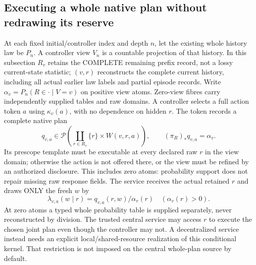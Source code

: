 \documentclass{article}
\begin{document}
\subsection{Executing a whole native plan without redrawing its reserve}
At each fixed initial/controller index and depth $n$, let the existing whole history law be $P_n$. A controller view $V_n$ is a countable projection of that history. In this subsection $R_v$ retains the COMPLETE remaining prefix record, not a lossy current-state statistic; $(v,r)$ reconstructs the complete current history, including all actual earlier law labels and partial episode records. Write $\alpha_v=P_n(R\in\cdot\mid V=v)$ on positive view atoms. Zero-view fibres carry independently supplied tables and raw domains. A controller selects a full action token $a$ using $\kappa_v(a)$, with no dependence on hidden $r$. The token records a complete native plan
\[
 q_{v,a}\in\mathcal P\left(\coprod_{r\in R_v}\{r\}\times W(v,r,a)\right),
 \qquad (\pi_R)_*q_{v,a}=\alpha_v.
\]
Its prescope template must be executable at every declared raw $r$ in the view domain; otherwise the action is not offered there, or the view must be refined by an authorized disclosure. This includes zero atoms: probability support does not repair missing raw response fields. The service receives the actual retained $r$ and draws ONLY the fresh $w$ by
\[
 \lambda_{v,a}(w\mid r)=q_{v,a}(r,w)/\alpha_v(r)
 \quad(\alpha_v(r)>0).\tag{2a}
\]
At zero atoms a typed whole probability table is supplied separately, never reconstructed by division. The trusted central service may access $r$ to execute the chosen joint plan even though the controller may not. A decentralized service instead needs an explicit local/shared-resource realization of this conditional kernel. That restriction is not imposed on the central whole-plan source by default.
\end{document}
